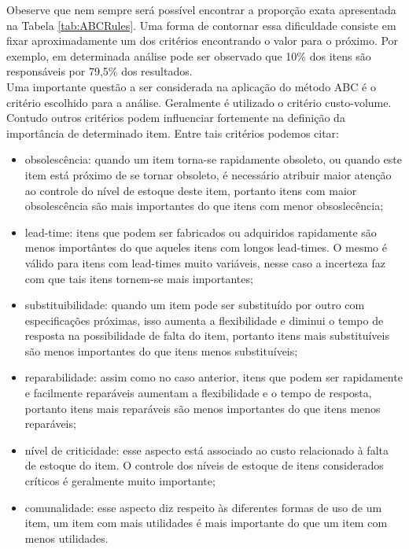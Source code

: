 \documentclass{book}
\begin{document}
Obeserve que nem sempre será possível encontrar a proporção exata apresentada na Tabela \ref{tab:ABCRules}. Uma forma de contornar essa dificuldade consiste em fixar aproximadamente um dos critérios encontrando o valor para o próximo. Por exemplo, em determinada análise pode ser observado que 10\% dos itens são responsáveis por 79,5\% dos resultados. \\

Uma importante questão a ser considerada na aplicação do método ABC é o critério escolhido para a análise. Geralmente é utilizado o critério custo-volume. Contudo outros critérios podem influenciar fortemente na definição da importância de determinado item. Entre tais critérios podemos citar:

\begin{itemize}
\item obsolescência: quando um item torna-se rapidamente obsoleto, ou quando este item está próximo de se tornar obsoleto, é necessário atribuir maior atenção ao controle do nível de estoque deste item, portanto itens com maior obsolescência são mais importantes do que itens com menor obsoslecência;
\item lead-time: itens que podem ser fabricados ou adquiridos rapidamente são menos importântes do que aqueles itens com longos lead-times. O mesmo é válido para itens com lead-times muito variáveis, nesse caso a incerteza faz com que tais itens tornem-se mais importantes;
\item substituibilidade: quando um item pode ser substituído por outro com especificações próximas, isso aumenta a flexibilidade e diminui o tempo de resposta na possibilidade de falta do item, portanto itens mais substituíveis são menos importantes do que itens menos substituíveis;
\item reparabilidade: assim como no caso anterior, itens que podem ser rapidamente e facilmente reparáveis aumentam a flexibilidade e o tempo de resposta, portanto itens mais reparáveis são menos importantes do que itens menos reparáveis;
\item nível de criticidade: esse aspecto está associado ao custo relacionado à falta de estoque do item. O controle dos níveis de estoque de itens considerados críticos é geralmente muito importante;
\item comunalidade: esse aspecto diz respeito às diferentes formas de uso de um item, um item com mais utilidades é mais importante do que um item com menos utilidades.
\end{itemize}
\end{document}

